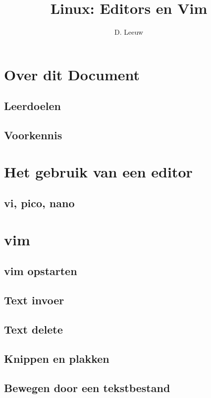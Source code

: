 \documentclass[a4paper,12pt,twoside,openright,titlepage]{article}
\author{D. Leeuw}
\title{Linux: Editors en Vim}
\date{\today\\
1.0.0\\
\vfill
\raggedright
\copyright\ 2020-2025 Dennis Leeuw\\
}
\begin{document}

\maketitle


\section{Over dit Document}
\subsection{Leerdoelen}

\subsection{Voorkennis}



\section{Het gebruik van een editor}

\subsection{vi, pico, nano}

\section{vim}

\subsection{vim opstarten}

\subsection{Text invoer}

\subsection{Text delete}

\subsection{Knippen en plakken}

\subsection{Bewegen door een tekstbestand}


\printindex
\end{document}
